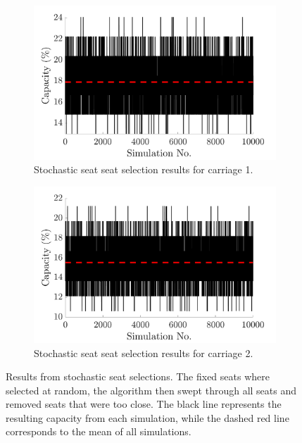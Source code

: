 \documentclass[11pt,a4paper]{article}
\begin{document}
\begin{itemize}
\begin{figure}[H]
         \centering
 \begin{subfigure}[b]{0.48\textwidth}
         \centering
         \includegraphics[width=1\textwidth]{tfw_car1_sim_plot_write.png}
         \caption{Stochastic seat seat selection results for carriage 1.}
         \label{fig:sim1}
     \end{subfigure}
          \hfill
     \begin{subfigure}[b]{0.48\textwidth}
         \centering
         \includegraphics[width=1\textwidth]{tfw_car2_sim_plot_write.png}
         \caption{Stochastic seat seat selection results for carriage 2.}
         \label{fig:sim2}
     \end{subfigure}
     
 
 \caption{Results from stochastic seat selections. The fixed seats where selected at random, the algorithm then swept through all seats and removed seats that were too close. The black line represents the resulting capacity from each simulation, while the dashed red line corresponds to the mean of all simulations.}
        \label{fig:Stochastic_sims}
\end{figure}









\end{itemize}
\end{document}
